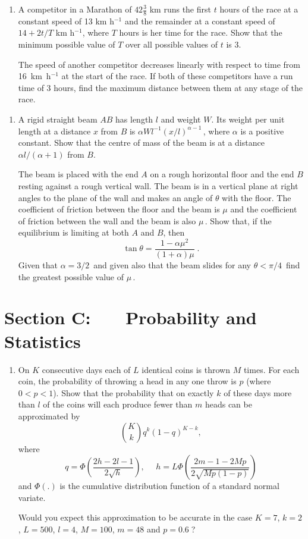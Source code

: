 \documentclass[a4, 11pt]{report}
\newlength{\qspace}
\newcounter{qnumber}
\newenvironment{question}%
 {\vspace{\qspace}
  \begin{enumerate}[\bfseries 1\quad][10]%
    \setcounter{enumi}{\value{qnumber}}%
    \item%
 }
{
  \end{enumerate}
  \filbreak
  \stepcounter{qnumber}
 }
\begin{document}
\begin{question}	
A competitor in a Marathon of $42 \frac38$ km 
 runs the first $t$ hours of the race at a constant speed of 13 km h$^{-1}$
and the remainder at a constant speed of $14 + 2t/T$ km h$^{-1}$, where $T$ hours
is her time for the race. Show that the minimum possible value of $T$ over
all possible values of $t$ is 3.

The speed of another competitor decreases linearly with respect
to time from 16~km~h$^{-1}$ at the start of the race.  If both of these
competitors have a run time of 3 hours, find the maximum distance between
them at any stage of the race.
\end{question}


\begin{question}
A rigid straight beam $AB$ has length $l$ and weight $W$. Its 
weight per unit length at a distance $x$ from $B$ is 
$\alpha Wl^{-1} (x/l)^{\alpha-1}\,$, where $\alpha$ is a positive 
constant. Show that the centre of mass of the beam is at a distance 
$\alpha l/(\alpha+1)$ from $B$.

The beam is placed with the end $A$ on a rough horizontal floor and the
end $B$ resting against a rough vertical wall. The beam is in a vertical
plane at right angles to the plane of the wall and makes an angle of
$\theta$ with the floor. The coefficient of friction
between the floor and the beam is $\mu$ and the coefficient of friction 
between the wall and the beam is also $\mu\,$.
Show that, if the equilibrium is limiting at both $A$ and $B$, then
\[
\tan\theta = \frac{1-\alpha \mu^2}{(1+\alpha)\mu}\;.
\]
Given that $\alpha =3/2\,$ and given also that the beam slides for any $\theta<\pi/4\,$
find the greatest  possible value of $\mu\,$. 
\end{question}
	

	
	\newpage
\section*{Section C: \ \ \ Probability and Statistics}


\begin{question}
On $K$ consecutive days each of $L$ identical coins
 is thrown $M$ times.  For each coin, the probability
of throwing a head in any one throw is $p$ (where $0 < p < 1$).
Show that the
probability that on exactly $k$ of these days more than $l$ of the coins
will each produce fewer than $m$ heads can be approximated by
\[
          {K \choose  k}q^k(1-q)^{K-k},
\]
where 
\[
q=\Phi\left( \frac{2h-2l-1}{2\sqrt{h} }\right),
\ \ \ \ \ \ 
h=L\Phi\left( \frac{2m-1-2Mp}{2\sqrt{ Mp(1-p)}}\right)
\]
and $\Phi(.)$ is the cumulative distribution function of a standard
normal variate.

Would you expect this approximation to be accurate in the case
$K=7$, $k=2$, $L=500$, $l=4$, $M=100$, $m=48$ and $p=0.6\;$?

\end{question}
\end{document}
